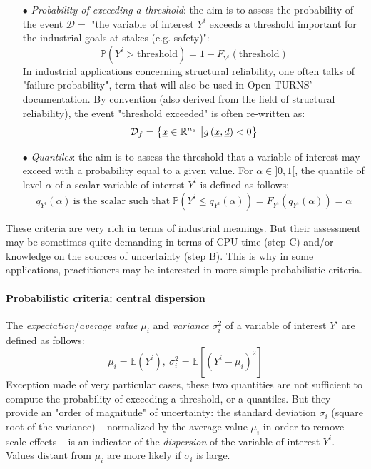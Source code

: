 \begin{itemize}
\item[$\bullet$] {\em Probability of exceeding a threshold}: the aim is to assess the probability of the event $\mathcal{D}=$ "the variable of interest $Y^i$ exceeds a threshold important for the industrial goals at stakes (e.g. safety)":
  $$
  \mathbb{P} \left( Y^i > \textrm{threshold} \right) = 1 - F_{Y^i} \left( \textrm{threshold} \right)
  $$
  In industrial applications concerning structural reliability, one often talks of "failure probability", term that will also be used in Open TURNS' documentation. By convention (also derived from the field of structural reliability), the event "threshold exceeded" is often re-written as:
  $$
  \mathcal{D}_f= \big\{ {\underline{x}} \in \mathbb{R}^{n_x} \ \big| g\left( \underline{x},\underline{d} \right) < 0 \big\}
  $$
\item[$\bullet$] {\em Quantiles}:  the aim is to assess the threshold that a variable of interest may exceed with a probability equal to a given value. For $\alpha \in ]0,1[$, the quantile of level $\alpha$ of a scalar variable of interest $Y^i$ is defined as follows:
    $$
    q_{Y^i}(\alpha) \ \textrm{is the scalar such that}\ \mathbb{P} \left( Y^i \leq q_{Y^i}(\alpha) \right) = F_{Y^i} \left( q_{Y^i}(\alpha) \right) = \alpha
    $$
\end{itemize}

These criteria are very rich in terms of industrial meanings. But their assessment may be sometimes quite demanding in terms of CPU time (step C) and/or knowledge on the sources of uncertainty (step B). This is why in some applications, practitioners may be interested in more simple probabilistic criteria.

\paragraph{Probabilistic criteria: central dispersion}
\par

The {\em expectation}/{\em average value} $\mu_{i}$ and {\em variance} $\sigma^2_{i}$ of a variable of interest $Y^i$ are defined as follows:
$$
\mu_{i} = \mathbb{E} \left( Y^i \right), \ \sigma^2_{i} = \mathbb{E} \left[ \left( Y^i - \mu_{i} \right)^2 \right]
$$
Exception made of very particular cases, these two quantities are not sufficient to compute the probability of exceeding a threshold, or a quantiles. But they provide an "order of magnitude" of uncertainty: the standard deviation $\sigma_{i}$ (square root of the variance) -- normalized by the average value $\mu_{i}$ in order to remove scale effects -- is an indicator of the {\em dispersion} of the variable of interest $Y^i$. Values distant from $\mu_{i}$ are more likely if $\sigma_{i}$ is large.

